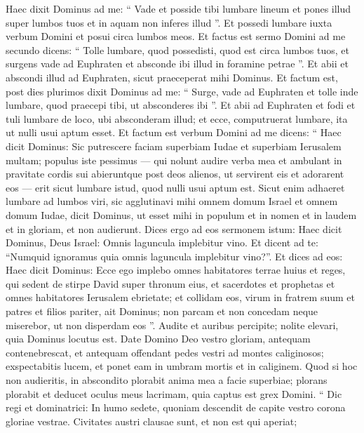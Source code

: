 \begin{biblechapter}
\begin{biblechapter}
\begin{biblechapter}
\begin{biblechapter}
\begin{biblechapter}
\begin{biblechapter}
\begin{biblechapter}
\begin{biblechapter}
\begin{biblechapter}
\begin{biblechapter}
\begin{biblechapter}
\begin{biblechapter}
\begin{biblechapter}
\verse Haec dixit Dominus ad me: “ Vade et posside tibi lumbare lineum et pones illud super lumbos tuos et in aquam non inferes illud ”. 
\verse Et possedi lumbare iuxta verbum Domini et posui circa lumbos meos. 
\verse Et factus est sermo Domini ad me secundo dicens: 
\verse “ Tolle lumbare, quod possedisti, quod est circa lumbos tuos, et surgens vade ad Euphraten et absconde ibi illud in foramine petrae ”. 
\verse Et abii et abscondi illud ad Euphraten, sicut praeceperat mihi Dominus. 
\verse Et factum est, post dies plurimos dixit Dominus ad me: “ Surge, vade ad Euphraten et tolle inde lumbare, quod praecepi tibi, ut absconderes ibi ”. 
\verse Et abii ad Euphraten et fodi et tuli lumbare de loco, ubi absconderam illud; et ecce, computruerat lumbare, ita ut nulli usui aptum esset. 
\verse Et factum est verbum Domini ad me dicens: 
\verse “ Haec dicit Dominus: Sic putrescere faciam superbiam Iudae et superbiam Ierusalem multam; 
\verse populus iste pessimus — qui nolunt audire verba mea et ambulant in pravitate cordis sui abieruntque post deos alienos, ut servirent eis et adorarent eos — erit sicut lumbare istud, quod nulli usui aptum est. 
\verse Sicut enim adhaeret lumbare ad lumbos viri, sic agglutinavi mihi omnem domum Israel et omnem domum Iudae, dicit Dominus, ut esset mihi in populum et in nomen et in laudem et in gloriam, et non audierunt.
 \verse Dices ergo ad eos sermonem istum: Haec dicit Dominus, Deus Israel: Omnis laguncula implebitur vino. Et dicent ad te: “Numquid ignoramus quia omnis laguncula implebitur vino?”. 
\verse Et dices ad eos: Haec dicit Dominus: Ecce ego implebo omnes habitatores terrae huius et reges, qui sedent de stirpe David super thronum eius, et sacerdotes et prophetas et omnes habitatores Ierusalem ebrietate; 
\verse et collidam eos, virum in fratrem suum et patres et filios pariter, ait Dominus; non parcam et non concedam neque miserebor, ut non disperdam eos ”.
 \verse Audite et auribus percipite; nolite elevari,
 quia Dominus locutus est.
 \verse Date Domino Deo vestro gloriam,
 antequam contenebrescat,
 et antequam offendant pedes vestri
 ad montes caliginosos;
 exspectabitis lucem,
 et ponet eam in umbram mortis
 et in caliginem.
 \verse Quod si hoc non audieritis,
 in abscondito plorabit anima mea
 a facie superbiae;
 plorans plorabit
 et deducet oculus meus lacrimam,
 quia captus est grex Domini.
 \verse “ Dic regi et dominatrici:
 In humo sedete,
 quoniam descendit de capite vestro
 corona gloriae vestrae.
 \verse Civitates austri clausae sunt,
 et non est qui aperiat;

\end{biblechapter}
\end{biblechapter}
\end{biblechapter}
\end{biblechapter}
\end{biblechapter}
\end{biblechapter}
\end{biblechapter}
\end{biblechapter}
\end{biblechapter}
\end{biblechapter}
\end{biblechapter}
\end{biblechapter}
\end{biblechapter}
